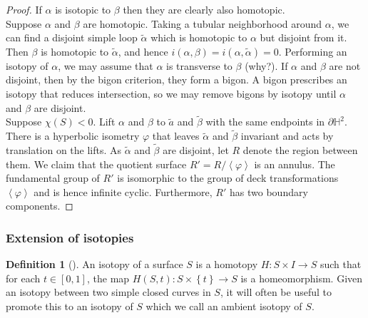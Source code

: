 \documentclass[reqno]{amsart}
\theoremstyle{definition}
\newtheorem{definition}[theorem]{Definition}
\theoremstyle{remark}
\begin{document}
\begin{proof}
    If $\alpha$ is isotopic to $\beta$ then they are clearly also
    homotopic.\\
    \linebreak
    Suppose $\alpha$ and $\beta$ are homotopic. Taking a
    tubular neighborhood around $\alpha$, we can find
    a disjoint simple loop $\tilde{\alpha}$ which is homotopic to
    $\alpha$ but disjoint from it. Then $\beta$ is homotopic
    to $\tilde{\alpha}$, and hence
    $i \left( \alpha, \beta \right) 
    = i \left( \alpha, \tilde{\alpha} \right) = 0$.
    Performing an isotopy of $\alpha$, we may assume that
    $\alpha$ is transverse to $\beta$ (why?).
    If $\alpha$ and $\beta$ are not disjoint, then by
    the bigon criterion, they form a bigon. A bigon
    prescribes an isotopy that reduces intersection, so we
    may remove bigons by isotopy until $\alpha$ and $\beta$ are
    disjoint.\\
    \linebreak
    Suppose $\chi (S) <0$. Lift $\alpha$ and $\beta$ to
    $\tilde{a}$ and $\tilde{\beta}$ with the
    same endpoints in $\partial \mathbb{H}^2$. There
    is a hyperbolic isometry $\varphi$ that leaves
    $\tilde{\alpha}$ and $\tilde{\beta}$ invariant and
    acts by translation on the lifts. As $\tilde{\alpha}$ and
    $\tilde{\beta}$ are disjoint, let $R$ denote the region
    between them. We claim that the quotient surface
    $R' = R / \left<\varphi \right>$ is an annulus.
    The fundamental group of $R'$ is isomorphic to the group of
    deck transformations $\left<\varphi \right>$ and is hence
    infinite cyclic. Furthermore, $R'$ has two boundary components.
\end{proof}


\subsubsection*{Extension of isotopies}

\begin{definition}[]
    An isotopy of a surface $S$ is a homotopy $H \colon 
    S \times I \to S$ such that for each
    $t \in \left[ 0,1 \right] $, the map
    $H \left( S, t \right) \colon S \times \left\{ t \right\} \to 
    S$ is a homeomorphism. Given an isotopy between
    two simple closed curves in $S$, it will often be useful
    to promote this to an isotopy of $S$ which we call an
    ambient isotopy of $S$.
\end{definition}
\end{document}
